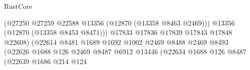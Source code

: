\begin{lexlean}{RustCore}
\begin{coremodule}
                                                                (@27250
                                                                  @27259
                                                                  @22588
                                                                  @13356
                                                                  (@12870 (@13358 @8463 @2469)))
                                                                @13356
                                                                (@12870 (@13358 @8453 @8471)))
                                                              @17833
                                                              @17836
                                                              @17839
                                                              @17843
                                                              @17848
                                                              @22608)
                                                            (@22614
                                                              @8481
                                                              @1689
                                                              @1692
                                                              @1002
                                                              @2469
                                                              @8488
                                                              @2469
                                                              @8493
                                                              (@22626
                                                                @1688
                                                                @126
                                                                @2469
                                                                @8487
                                                                @6912
                                                                @13446
                                                                (@22634
                                                                  @1688
                                                                  @126
                                                                  @8487
                                                                  (@22639
                                                                    @1686
                                                                    @214
                                                                    @124

\end{coremodule}
\end{lexlean}

